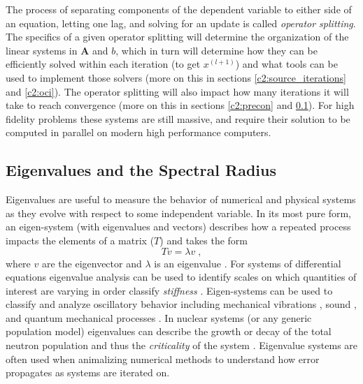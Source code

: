 The process of separating components of the dependent variable to either side of an equation, letting one lag, and solving for an update is called \emph{operator splitting}.
The specifics of a given operator splitting will determine the organization of the linear systems in $\bm{A}$ and $b$, which in turn will determine how they can be efficiently solved within each iteration (to get $x^{(l+1)}$) and what tools can be used to implement those solvers (more on this in sections \ref{c2:source_iterations} and \ref{c2:oci}).
The operator splitting will also impact how many iterations it will take to reach convergence (more on this in sections \ref{c2:precon} and \ref{c2:specrad}).
For high fidelity problems these systems are still massive, and require their solution to be computed in parallel on modern high performance computers.


\subsection{Eigenvalues and the Spectral Radius}
\label{c2:specrad}

Eigenvalues are useful to measure the behavior of numerical and physical systems as they evolve with respect to some independent variable.
In its most pure form, an eigen-system (with eigenvalues and vectors) describes how a repeated process impacts the elements of a matrix ($T$) and takes the form
\begin{equation}
    {T}v = \lambda v \;,
\end{equation}
where $v$ are the eigenvector and $\lambda$ is an eigenvalue \cite{isaacson_numerical_1966, golub_matrix_1983}.
For systems of differential equations eigenvalue analysis can be used to identify scales on which quantities of interest are varying in order classify \emph{stiffness} \cite{niemeyer_phd, walker_phd}.
Eigen-systems can be used to classify and analyze oscillatory behavior including mechanical vibrations \cite{liang_vibrations}, sound \cite{howle_2001_eigenvalues}, and quantum mechanical processes \cite{maggie_phd, krane_2019_modern}.
In nuclear systems (or any generic population model) eigenvalues can describe the growth or decay of the total neutron population and thus the \emph{criticality} of the system \cite{duderstadt_hamilton, trahan_phd}.
Eigenvalue systems are often used when animalizing numerical methods to understand how error propagates as systems are iterated on.

